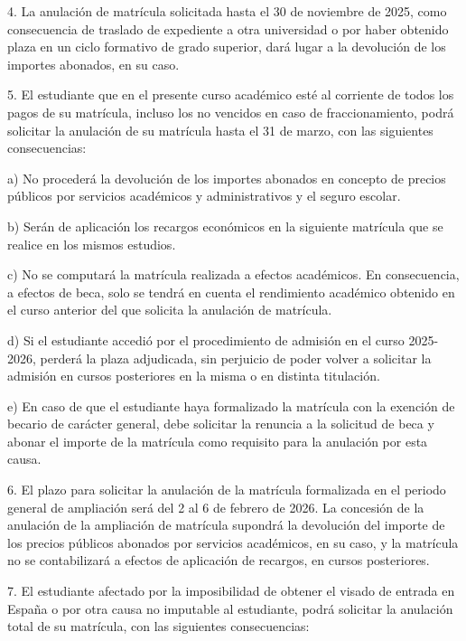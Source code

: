 \documentclass{article}
\begin{document}
\begin{itemize}
\begin{itemize}
\begin{scriptsize}
                  4. La anulación de matrícula solicitada hasta el 30 de noviembre de 2025, como consecuencia de traslado de expediente a otra universidad o por haber obtenido plaza en un ciclo formativo de grado superior, dará lugar a la devolución de los importes abonados, en su caso.

                  5. El estudiante que en el presente curso académico esté al corriente de todos los pagos de su matrícula, incluso los no vencidos en caso de fraccionamiento, podrá solicitar la anulación de su matrícula hasta el 31 de marzo, con las siguientes consecuencias:

                  a) No procederá la devolución de los importes abonados en concepto de precios públicos por servicios académicos y administrativos y el seguro escolar.

                  b) Serán de aplicación los recargos económicos en la siguiente matrícula que se realice en los mismos estudios.

                  c) No se computará la matrícula realizada a efectos académicos. En consecuencia, a efectos de beca, solo se tendrá en cuenta el rendimiento académico obtenido en el curso anterior del que solicita la anulación de matrícula.

                  d) Si el estudiante accedió por el procedimiento de admisión en el curso 2025-2026, perderá la plaza adjudicada, sin perjuicio de poder volver a solicitar la admisión en cursos posteriores en la misma o en distinta titulación.

                  e) En caso de que el estudiante haya formalizado la matrícula con la exención de becario de carácter general, debe solicitar la renuncia a la solicitud de beca y abonar el importe de la matrícula como requisito para la anulación por esta causa.

                  6. El plazo para solicitar la anulación de la matrícula formalizada en el periodo general de ampliación será del 2 al 6 de febrero de 2026. La concesión de la anulación de la ampliación de matrícula supondrá la devolución del importe de los precios públicos abonados por servicios académicos, en su caso, y la matrícula no se contabilizará a efectos de aplicación de recargos, en cursos posteriores.

                  7. El estudiante afectado por la imposibilidad de obtener el visado de entrada en España o por otra causa no imputable al estudiante, podrá solicitar la anulación total de su matrícula, con las siguientes consecuencias:


\end{scriptsize}
\end{itemize}
\end{itemize}
\end{document}
